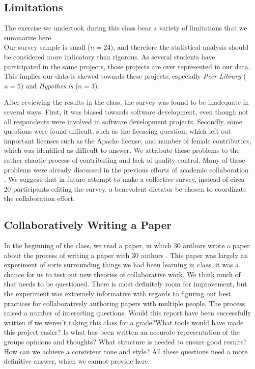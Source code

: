 \subsection{Limitations}
\label{sec:limitations}
The exercise we undertook during this class bear a variety of limitations that we summarize here. \\

\noindent Our survey sample is small ($n=24$), and therefore the statistical analysis should be considered more indicatory than rigorous. As several students have participated in the same projects, those projects are over represented in our data. This implies our data is skewed towards these projects, especially {\it Peer Library} ($n=5$) and {\it Hypothes.is} ($n=3$).

After reviewing the results in the class, the survey was found to be inadequate in several ways. First, it was biased towards software development, even though not all respondents were involved in software development projects. Secondly, some questions were found difficult, such as the licensing question, which left out important licenses such as the Apache license, and number of female contributors, which was identified as difficult to answer. We attribute these problems to the rather chaotic process of contributing and lack of quality control.  Many of these problems were already discussed in the previous efforts of academic collaboration \cite{Tomlinson2012}. We suggest that in future attempt to make a collective survey, instead of circa 20 participants editing the survey, a benevolent dictator be chosen to coordinate the collaboration effort.

\subsection{Collaboratively Writing a Paper}
In the beginning of the class, we read a paper, in which 30 authors wrote a paper about the process of writing a paper with 30 authors \cite{Tomlinson2012}. This paper was largely an experiment of sorts surrounding things we had been learning in class, it was a chance for us to test out new theories of collaborative work.
We think much of that needs to be questioned. There is most definitely room for improvement, but the experiment was extremely informative with regards to figuring out best practices for collaboratively authoring papers with multiple people.  
The process raised a number of interesting questions.
Would this report have been successfully written if we weren't taking this class for a grade?What tools would have made this project easier? 
Is what has been written an accurate representation of the groups opinions and thoughts? 
What structure is needed to ensure good results?
How can we achieve a consistent tone and style? All these questions need a more definitive answer, which we cannot provide here.\\

